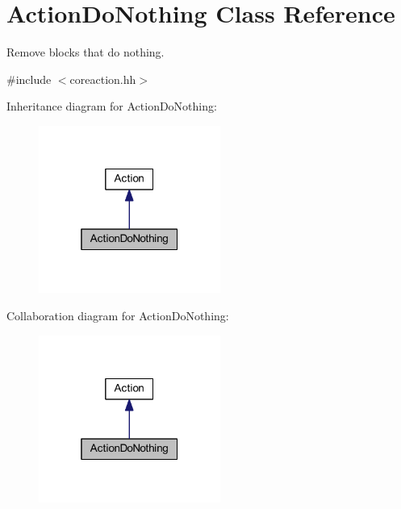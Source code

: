 \hypertarget{class_action_do_nothing}{}\section{Action\+Do\+Nothing Class Reference}
\label{class_action_do_nothing}


Remove blocks that do nothing.  




{\ttfamily \#include $<$coreaction.\+hh$>$}



Inheritance diagram for Action\+Do\+Nothing\+:
\nopagebreak
\begin{figure}[H]
\begin{center}
\leavevmode
\includegraphics[width=169pt]{class_action_do_nothing__inherit__graph}
\end{center}
\end{figure}


Collaboration diagram for Action\+Do\+Nothing\+:
\nopagebreak
\begin{figure}[H]
\begin{center}
\leavevmode
\includegraphics[width=169pt]{class_action_do_nothing__coll__graph}
\end{center}
\end{figure}
